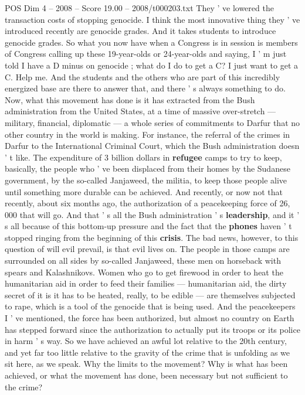 \begin{textsample}{POS Dim 4 – 2008 – Score 19.00 – 2008/t000203.txt}
They ' ve lowered the transaction costs of stopping genocide.
I think the most innovative thing they ' ve introduced recently are genocide grades.
And it takes students to introduce genocide grades.
So what you now have when a Congress is in session is members of Congress calling up these 19-year-olds or 24-year-olds and saying, I ' m just told I have a D minus on genocide ; what do I do to get a C?
I just want to get a C.
Help me.
And the students and the others who are part of this incredibly energized base are there to answer that, and there ' s always something to do.
Now, what this movement has done is it has extracted from the Bush administration from the United States, at a time of massive over-stretch — military, financial, diplomatic — a whole series of commitments to Darfur that no other country in the world is making.
For instance, the referral of the crimes in Darfur to the International Criminal Court, which the Bush administration doesn ' t like.
The expenditure of 3 billion dollars in \textbf{refugee} camps to try to keep, basically, the people who ' ve been displaced from their homes by the Sudanese government, by the so-called Janjaweed, the militia, to keep those people alive until something more durable can be achieved.
And recently, or now not that recently, about six months ago, the authorization of a peacekeeping force of 26, 000 that will go.
And that ' s all the Bush administration ' s \textbf{leadership}, and it ' s all because of this bottom-up pressure and the fact that the \textbf{phones} haven ' t stopped ringing from the beginning of this \textbf{crisis}.
The bad news, however, to this question of will evil prevail, is that evil lives on.
The people in those camps are surrounded on all sides by so-called Janjaweed, these men on horseback with spears and Kalashnikovs.
Women who go to get firewood in order to heat the humanitarian aid in order to feed their families — humanitarian aid, the dirty secret of it is it has to be heated, really, to be edible — are themselves subjected to rape, which is a tool of the genocide that is being used.
And the peacekeepers I ' ve mentioned, the force has been authorized, but almost no country on Earth has stepped forward since the authorization to actually put its troops or its police in harm ' s way.
So we have achieved an awful lot relative to the 20th century, and yet far too little relative to the gravity of the crime that is unfolding as we sit here, as we speak.
Why the limits to the movement?
Why is what has been achieved, or what the movement has done, been necessary but not sufficient to the crime?

\end{textsample}
